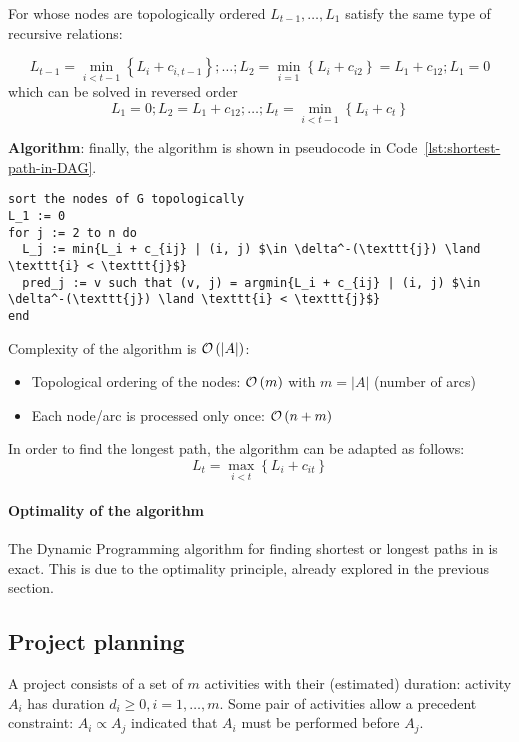\documentclass[english]{article}
\begin{document}
For \DAGs whose nodes are topologically ordered \(L_{t-1}, \ldots, L_1\) satisfy the same type of recursive relations:

\[ L_{t-1} = \displaystyle \min_{i < t-1} \left\{ L_i + c_{i, t-1} \right\}; \ldots; L_2 = \displaystyle \min_{i=1}\left\{ L_i + c_{i2} \right\} = L_1 + c_{12}; L_1 = 0 \]
which can be solved in reversed order
\[ L_1 = 0; L_2 = L_1 + c_{12}; \ldots; L_{t} = \displaystyle \min_{i < t - 1} \left\{ L_i + c_t \right\} \]

\bigskip
\textbf{Algorithm}:
finally, the algorithm is shown in pseudocode in Code~\ref{lst:shortest-path-in-DAG}.

\begin{lstlisting}[style=custom, language=pseudocode, caption={Shortest path in \DAG}, label={lst:shortest-path-in-DAG}, float]
sort the nodes of G topologically
L_1 := 0
for j := 2 to n do
  L_j := min{L_i + c_{ij} | (i, j) $\in \delta^-(\texttt{j}) \land \texttt{i} < \texttt{j}$}
  pred_j := v such that (v, j) = argmin{L_i + c_{ij} | (i, j) $\in \delta^-(\texttt{j}) \land \texttt{i} < \texttt{j}$}
end
\end{lstlisting}

\bigskip
Complexity of the algorithm is \(\mathcal{O}\left(|A|\right)\):

\begin{itemize}
  \item Topological ordering of the nodes: \(\mathcal{O}\left(m\right)\) with \(m = |A|\) (number of arcs)
  \item Each node/arc is processed only once: \(\mathcal{O}\left(n+m\right)\)
\end{itemize}

\bigskip
In order to find the longest path, the algorithm can be adapted as follows:
\[L_t = \displaystyle \max_{i < t} \left\{ L_i + c_{it} \right\}\]

\paragraph{Optimality of the algorithm}

The Dynamic Programming algorithm for finding shortest or longest paths in \DAGs is exact.
This is due to the optimality principle, already explored in the previous section.

\subsection{Project planning}

A project consists of a set of \(m\) activities with their (estimated) duration: activity \(A_i\) has duration \(d_i \geq 0, i = 1, \ldots, m\).
Some pair of activities allow a precedent constraint: \(A_i \propto A_j\) indicated that \(A_i\) must be performed before \(A_j\).
\end{document}
